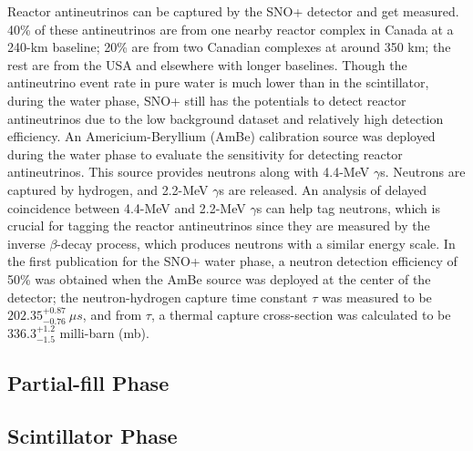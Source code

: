 Reactor antineutrinos can be captured by the SNO+ detector and get measured. 40\% of these antineutrinos are from one nearby reactor complex in Canada at a 240-km baseline; 20\% are from two Canadian complexes at around 350 km; the rest are from the USA and elsewhere with longer baselines\cite{whitepaper}. Though the antineutrino event rate in pure water is much lower than in the scintillator, during the water phase, SNO+ still has the potentials to detect reactor antineutrinos due to the low background dataset and relatively high detection efficiency. An Americium-Beryllium (AmBe) calibration source was deployed during the water phase to evaluate the sensitivity for detecting reactor antineutrinos.  This source provides neutrons along with 4.4-MeV $\gamma$s. Neutrons are captured by hydrogen, and 2.2-MeV $\gamma$s are released. An analysis of delayed coincidence between 4.4-MeV and 2.2-MeV $\gamma$s can help tag neutrons, which is crucial for tagging the reactor antineutrinos since they are measured by the inverse $\beta$-decay process, which produces neutrons with a similar energy scale. In the first publication for the SNO+ water phase, a neutron detection efficiency of 50\% was obtained when the AmBe source was deployed at the center of the detector; the neutron-hydrogen capture time constant $\tau$ was measured to be $202.35_{-0.76}^{+0.87}~\mu s$, and from $\tau$, a thermal capture cross-section was calculated to be $336.3^{+1.2}_{-1.5}$ milli-barn (mb)\cite{anderson2020measurement}.


\subsection{Partial-fill Phase} \label{sect:partialPhase}

\subsection{Scintillator Phase} \label{sect:scintPhase}

